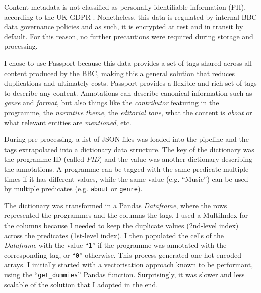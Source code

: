 
Content metadata is not classified as personally identifiable information (PII), according to the UK GDPR \cite{UKGDPR}. Nonetheless,
this data is regulated by internal BBC data governance policies and as such, it is encrypted at rest and in transit by default.
For this reason, no further precautions were required during storage and processing.


I chose to use Passport because this data provides a set of tags shared across all content produced by the BBC,
making this a general solution that reduces duplications and ultimately costs. Passport provides a flexible and rich set of tags to describe
any content. Annotations can describe canonical information such as \textit{genre} and \textit{format}, but also things like the \textit{contributor}
featuring in the programme, the \textit{narrative theme}, the \textit{editorial tone}, what the content is \textit{about}
or what relevant entities are \textit{mentioned}, etc.


During pre-processing, a list of JSON files was loaded into the pipeline and the tags extrapolated into a dictionary data structure.
The key of the dictionary was the programme ID (called \textit{PID}) and the value was another dictionary describing the annotations.
A programme can be tagged with the same predicate multiple times if it has different values,
while the same value (e.g. ``Music'') can be used by multiple predicates (e.g. \verb|about| or \verb|genre|).

The dictionary was transformed in a Pandas \textit{Dataframe}, where the rows represented the programmes and the columns the tags.
I used a MultiIndex \cite{Pandas:MultiIndex} for the columns because I needed to keep the duplicate values (2nd-level index) across the predicates
(1st-level index).
I then populated the cells of the \textit{Dataframe} with the value ``\verb|1|'' if the programme was annotated with the corresponding tag,
or ``\verb|0|'' otherwise.
This process generated one-hot encoded arrays. I initially started with a vectorisation approach known to be performant,
using the ``\verb|get_dummies|'' Pandas function. Surprisingly, it was slower and less scalable of the solution that
I adopted in the end.

